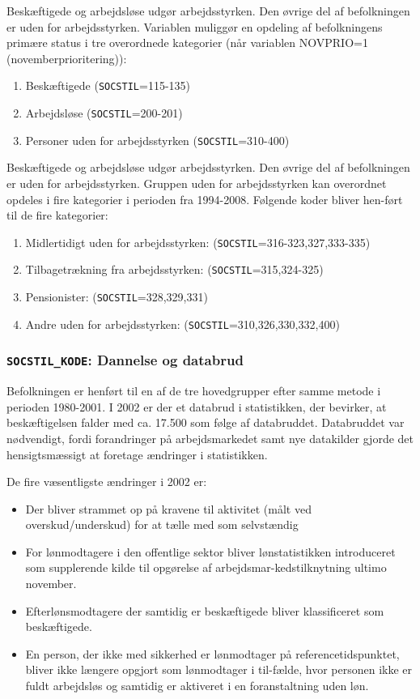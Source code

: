 Beskæftigede og arbejdsløse udgør arbejdsstyrken. Den øvrige del af befolkningen er uden for arbejdsstyrken.
Variablen muliggør en opdeling af befolkningens primære status i tre overordnede kategorier (når variablen NOVPRIO=1 (novemberprioritering)):
\begin{enumerate} [topsep=6pt,itemsep=-1ex]
  \item Beskæftigede (\texttt{SOCSTIL}=115-135)
  \item Arbejdsløse (\texttt{SOCSTIL}=200-201)
  \item Personer uden for arbejdsstyrken (\texttt{SOCSTIL}=310-400)
\end{enumerate}

Beskæftigede og arbejdsløse udgør arbejdsstyrken. Den øvrige del af befolkningen er uden for arbejdsstyrken. Gruppen uden for arbejdsstyrken kan overordnet opdeles i fire kategorier i perioden fra 1994-2008. Følgende koder bliver hen-ført til de fire kategorier:
\begin{enumerate} [topsep=6pt,itemsep=-1ex]
  \item Midlertidigt uden for arbejdsstyrken: (\texttt{SOCSTIL}=316-323,327,333-335)
  \item Tilbagetrækning fra arbejdsstyrken: (\texttt{SOCSTIL}=315,324-325)
  \item Pensionister: (\texttt{SOCSTIL}=328,329,331)
  \item Andre uden for arbejdsstyrken: (\texttt{SOCSTIL}=310,326,330,332,400)
\end{enumerate}


\subsubsection{\texttt{SOCSTIL\_KODE}: Dannelse og databrud \label{}}

Befolkningen er henført til en af de tre hovedgrupper efter samme metode i perioden 1980-2001. I 2002 er der et databrud i statistikken, der bevirker, at beskæftigelsen falder med ca. 17.500 som følge af databruddet. Databruddet var nødvendigt, fordi forandringer på arbejdsmarkedet samt nye datakilder gjorde det hensigtsmæssigt at foretage ændringer i statistikken.

De fire væsentligste ændringer i 2002 er:
\begin{itemize} [topsep=6pt,itemsep=-1ex]
  \item Der bliver strammet op på kravene til aktivitet (målt ved overskud/underskud) for at tælle med som selvstændig
  \item For lønmodtagere i den offentlige sektor bliver lønstatistikken introduceret som supplerende kilde til opgørelse af arbejdsmar-kedstilknytning ultimo november.
  \item Efterlønsmodtagere der samtidig er beskæftigede bliver klassificeret som beskæftigede.
  \item En person, der ikke med sikkerhed er lønmodtager på referencetidspunktet, bliver ikke længere opgjort som lønmodtager i til-fælde, hvor personen ikke er fuldt arbejdsløs og samtidig er aktiveret i en foranstaltning uden løn.
 \end{itemize}

